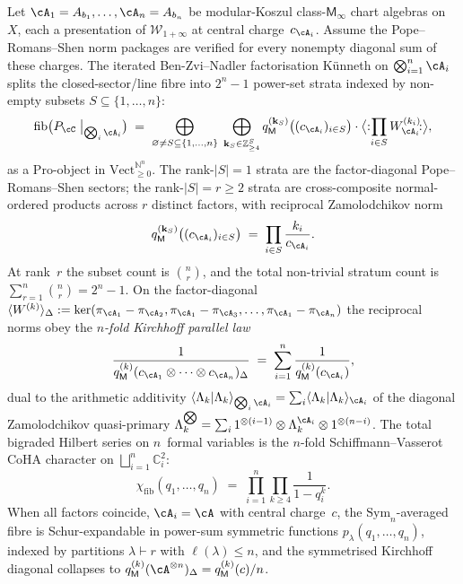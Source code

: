 \begin{theorem}
Let $\cA_1=A_{b_1},\ldots,\cA_n=A_{b_n}$ be modular-Koszul
class-$\mathsf M_\infty$ chart algebras on~$X$, each a presentation
of $\mathcal W_{1+\infty}$
at central charge~$c_{\cA_i}$. Assume the Pope--Romans--Shen norm
packages are verified for every nonempty diagonal sum of these charges.
The iterated Ben-Zvi--Nadler factorisation K\"unneth on
$\bigotimes_{i=1}^n\cA_i$ splits the
closed-sector/line fibre into $2^n-1$ power-set strata indexed by non-empty
subsets $S\subseteq\{1,\ldots,n\}$:
\begin{equation}\label{eq:hdm-m-infty-nfold-fibre}
\mathrm{fib}\bigl(P_\cC\bigm|_{\bigotimes_i\cA_i}\bigr)
\;=\;
\bigoplus_{\varnothing\neq S\subseteq\{1,\ldots,n\}}\;
\bigoplus_{\mathbf{k}_S\in\mathbb Z_{\geq 4}^S}
q_\mathsf M^{(\mathbf{k}_S)}\bigl((c_{\cA_i})_{i\in S}\bigr)\cdot
\bigl\langle {:}\!\prod_{i\in S}W^{(k_i)}_{\cA_i}\!{:}\bigr\rangle,
\end{equation}
as a $\mathrm{Pro}$-object in $\mathrm{Vect}_{\geq 0}^{\mathbb N^{n}}$.
The rank-$|S|=1$ strata are the factor-diagonal Pope--Romans--Shen
sectors; the rank-$|S|=r\geq 2$ strata are cross-composite
normal-ordered products across $r$ distinct factors, with reciprocal
Zamolodchikov norm
\begin{equation}\label{eq:hdm-m-infty-nfold-cross}
q_\mathsf M^{(\mathbf{k}_S)}\bigl((c_{\cA_i})_{i\in S}\bigr)
\;=\;\prod_{i\in S}\frac{k_i}{c_{\cA_i}}.
\end{equation}
At rank~$r$ the subset count is $\binom{n}{r}$, and the total
non-trivial stratum count is $\sum_{r=1}^n\binom{n}{r}=2^n-1$.
On the factor-diagonal
$\langle W^{(k)}\rangle_{\Delta} := \ker(\pi_{\cA_1}-\pi_{\cA_2},
\pi_{\cA_1}-\pi_{\cA_3},\ldots,\pi_{\cA_1}-\pi_{\cA_n})$ the reciprocal
norms obey the \emph{$n$-fold Kirchhoff parallel law}
\begin{equation}\label{eq:hdm-m-infty-nfold-kirchhoff}
\frac{1}{q_\mathsf M^{(k)}(c_{\cA_1}\otimes\cdots\otimes
c_{\cA_n})_{\Delta}}
\;=\;\sum_{i=1}^n\frac{1}{q_\mathsf M^{(k)}(c_{\cA_i})},
\end{equation}
dual to the arithmetic additivity
$\langle\Lambda_k|\Lambda_k\rangle_{\bigotimes_i\cA_i}
=\sum_i\langle\Lambda_k|\Lambda_k\rangle_{\cA_i}$ of the diagonal
Zamolodchikov quasi-primary
$\Lambda_k^{\bigotimes}=\sum_i 1^{\otimes(i-1)}\otimes\Lambda_k^{\cA_i}
\otimes 1^{\otimes(n-i)}$. The total bigraded Hilbert series on
$n$~formal variables is the $n$-fold Schiffmann--Vasserot CoHA
character on $\bigsqcup_{i=1}^n\mathbb C^2_i$:
\begin{equation}\label{eq:hdm-m-infty-nfold-hilbert}
\chi_{\mathrm{fib}}(q_1,\ldots,q_n)
\;=\;\prod_{i=1}^n\prod_{k\geq 4}\frac{1}{1-q_i^k}.
\end{equation}
When all factors coincide, $\cA_i=\cA$ with central charge~$c$, the
$\mathrm{Sym}_n$-averaged fibre is Schur-expandable in power-sum
symmetric functions $p_\lambda(q_1,\ldots,q_n)$, indexed by
partitions $\lambda\vdash r$ with $\ell(\lambda)\leq n$, and the
symmetrised Kirchhoff diagonal collapses to
$q_\mathsf M^{(k)}(\cA^{\otimes n})_{\Delta}=q_\mathsf M^{(k)}(c)/n$.
\end{theorem}

